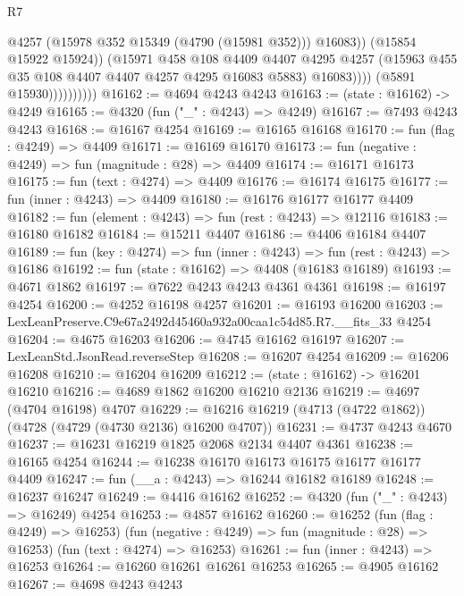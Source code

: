 \begin{lexlean}{R7}
\begin{coremodule}
                                  @4257
                                  (@15978 @352 @15349 (@4790 (@15981 @352)))
                                  @16083))
                              (@15854 @15922 @15924))
                            (@15971
                              @458
                              @108
                              @4409
                              @4407
                              @4295
                              @4257
                              (@15963 @455 @35 @108 @4407 @4407 @4257 @4295 @16083 @5883)
                              @16083))))
                      (@5891 @15930))))))))))
@16162 := @4694 @4243 @4243
@16163 := (state : @16162) -> @4249
@16165 := @4320 (fun ("_" : @4243) => @4249)
@16167 := @7493 @4243 @4243
@16168 := @16167 @4254
@16169 := @16165 @16168
@16170 := fun (flag : @4249) => @4409
@16171 := @16169 @16170
@16173 := fun (negative : @4249) => fun (magnitude : @28) => @4409
@16174 := @16171 @16173
@16175 := fun (text : @4274) => @4409
@16176 := @16174 @16175
@16177 := fun (inner : @4243) => @4409
@16180 := @16176 @16177 @16177 @4409
@16182 := fun (element : @4243) => fun (rest : @4243) => @12116
@16183 := @16180 @16182
@16184 := @15211 @4407
@16186 := @4406 @16184 @4407
@16189 := fun (key : @4274) => fun (inner : @4243) => fun (rest : @4243) => @16186
@16192 := fun (state : @16162) => @4408 (@16183 @16189)
@16193 := @4671 @1862
@16197 := @7622 @4243 @4243 @4361 @4361
@16198 := @16197 @4254
@16200 := @4252 @16198 @4257
@16201 := @16193 @16200
@16203 := LexLeanPreserve.C9e67a2492d45460a932a00caa1c54d85.R7.__fits_33 @4254
@16204 := @4675 @16203
@16206 := @4745 @16162 @16197
@16207 := LexLeanStd.JsonRead.reverseStep
@16208 := @16207 @4254
@16209 := @16206 @16208
@16210 := @16204 @16209
@16212 := (state : @16162) -> @16201 @16210
@16216 := @4689 @1862 @16200 @16210 @2136
@16219 := @4697 (@4704 @16198) @4707
@16229 := @16216 @16219 (@4713 (@4722 @1862)) (@4728 (@4729 (@4730 @2136) @16200 @4707))
@16231 := @4737 @4243 @4670
@16237 := @16231 @16219 @1825 @2068 @2134 @4407 @4361
@16238 := @16165 @4254
@16244 := @16238 @16170 @16173 @16175 @16177 @16177 @4409
@16247 := fun (__a : @4243) => @16244 @16182 @16189
@16248 := @16237 @16247
@16249 := @4416 @16162
@16252 := @4320 (fun ("_" : @4243) => @16249) @4254
@16253 := @4857 @16162
@16260 := @16252
    (fun (flag : @4249) => @16253)
    (fun (negative : @4249) => fun (magnitude : @28) => @16253)
    (fun (text : @4274) => @16253)
@16261 := fun (inner : @4243) => @16253
@16264 := @16260 @16261 @16261 @16253
@16265 := @4905 @16162
@16267 := @4698 @4243 @4243

\end{coremodule}
\end{lexlean}
